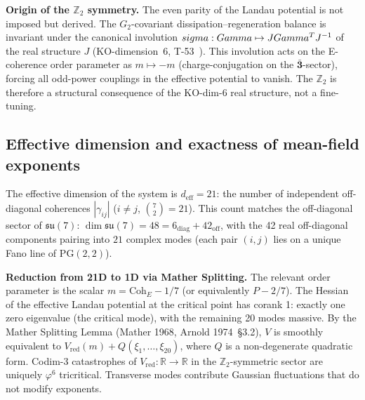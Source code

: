 \textbf{Origin of the $\mathbb{Z}_2$ symmetry.} The even parity of the Landau
potential is not imposed but derived. The $G_2$-covariant dissipation--regeneration
balance is invariant under the canonical involution
$sigma: Gamma \mapsto JGamma^T J^{-1}$ of the real structure $J$ (KO-dimension~6,
T-53~). This involution acts on the E-coherence order parameter as
$m \mapsto -m$ (charge-conjugation on the $\bar{\mathbf{3}}$-sector), forcing all
odd-power couplings in the effective potential to vanish. The $\mathbb{Z}_2$ is
therefore a structural consequence of the KO-dim-6 real structure, not a fine-tuning.

\subsection{Effective dimension and exactness of mean-field exponents}

The effective dimension of the system is $d_{\mathrm{eff}} = 21$: the number of
independent off-diagonal coherences $|\gamma_{ij}|$ ($i \neq j$, $\binom{7}{2} = 21$).
This count matches the off-diagonal sector of $\mathfrak{su}(7)$:
$\dim\mathfrak{su}(7) = 48 = 6_\mathrm{diag} + 42_\mathrm{off}$, with the 42 real
off-diagonal components pairing into $21$ complex modes (each pair $(i,j)$ lies
on a unique Fano line of $\mathrm{PG}(2,2)$).

\textbf{Reduction from 21D to 1D via Mather Splitting.} The relevant order parameter
is the scalar $m = \mathrm{Coh}_E - 1/7$ (or equivalently $P - 2/7$). The Hessian of
the effective Landau potential at the critical point has corank 1: exactly one
zero eigenvalue (the critical mode), with the remaining 20 modes massive. By the
Mather Splitting Lemma (Mather 1968, Arnold 1974~\S3.2), $V$ is smoothly equivalent
to $V_\mathrm{red}(m) + Q(\xi_1,\ldots,\xi_{20})$, where $Q$ is a non-degenerate
quadratic form. Codim-3 catastrophes of $V_\mathrm{red}: \mathbb R \to \mathbb R$
in the $\mathbb Z_2$-symmetric sector are uniquely $\varphi^6$ tricritical.
Transverse modes contribute Gaussian fluctuations that do not modify exponents.


